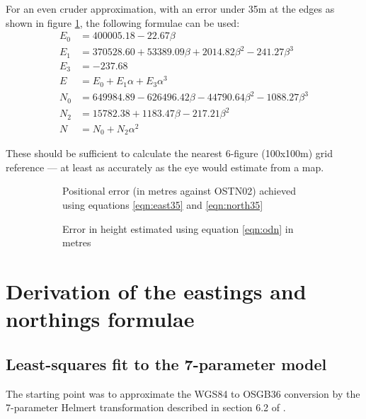 \documentclass[10pt,a4paper]{article}
\def\gap{\hspace{2cm}}
\begin{document}
For an even cruder approximation, with an error under 35m at the edges
as shown in figure \ref{fig:35-metre-model}, the following formulae can be
used:
\begin{align}
E_0 &= 400005.18 -22.67\beta\nonumber \\
E_1 &= 370528.60 +53389.09\beta +2014.82\beta^2 -241.27\beta^3\nonumber \\
E_3 &= -237.68\nonumber \\
E &= E_0 +E_1\alpha +E_3\alpha^3
  \label{eqn:east35}
\\[2ex]
N_0 &= 649984.89 -626496.42\beta -44790.64\beta^2 -1088.27\beta^3\nonumber \\
N_2 &= 15782.38 +1183.47\beta -217.21\beta^2\nonumber \\
N &= N_0 +N_2\alpha^2
  \label{eqn:north35}
\end{align}

These should be sufficient to calculate the nearest 6-figure (100x100m) grid
reference --- at least as accurately as the eye would estimate from a map.

\begin{figure}[htb]
  \begin{subfigure}[b]{0.4\textwidth}
  \centering
  \fbox{
    
  }
  \caption{Positional error (in metres against OSTN02) achieved using equations \eqref{eqn:east35} and \eqref{eqn:north35}}
  \label{fig:35-metre-model}
  \end{subfigure}
\gap
  \begin{subfigure}[b]{0.4\textwidth}
  \centering
  \fbox{
    
  }
  \caption{Error in height estimated using equation \eqref{eqn:odn} in metres}
  \label{fig:odn_base}
  \end{subfigure}
\caption{}
\hrulefill
\end{figure}

\section {Derivation of the eastings and northings formulae}
\subsection {Least-squares fit to the 7-parameter model}
\label{sec:lsq_helmert}
The starting point was to approximate the WGS84 to OSGB36 conversion by the
7-parameter Helmert transformation described in section 6.2 of \cite{gcs}.
\end{document}
